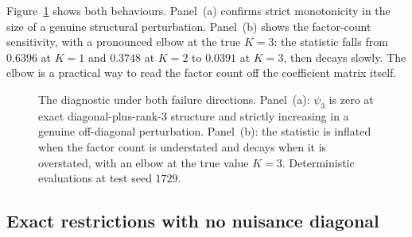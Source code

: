 \documentclass[10pt,twocolumn]{article}
\theoremstyle{remark}
\begin{document}
Figure~\ref{fig:diagnostic} shows both behaviours. Panel~(a) confirms strict
monotonicity in the size of a genuine structural perturbation. Panel~(b) shows
the factor-count sensitivity, with a pronounced elbow at the true $K=3$: the
statistic falls from $0.6396$ at $K=1$ and $0.3748$ at $K=2$ to $0.0391$ at
$K=3$, then decays slowly. The elbow is a practical way to read the factor
count off the coefficient matrix itself.

\begin{figure}[t]
\centering
{}

\vspace{4pt}

\caption{The diagnostic under both failure directions. Panel~(a): $\psi_3$ is
zero at exact diagonal-plus-rank-$3$ structure and strictly increasing in a
genuine off-diagonal perturbation. Panel~(b): the statistic is inflated when
the factor count is understated and decays when it is overstated, with an
elbow at the true value $K=3$. Deterministic evaluations at test seed $1729$.}
\label{fig:diagnostic}
\end{figure}

\subsection{Exact restrictions with no nuisance diagonal}
\label{sec:crossblock}
\end{document}
